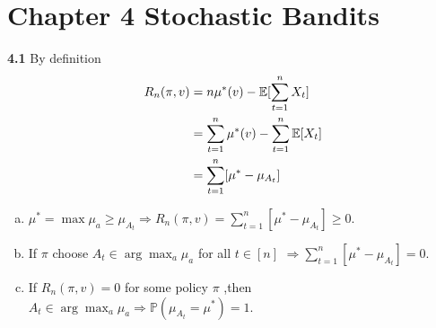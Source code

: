 \chapter*{Chapter 4 Stochastic Bandits}
\label{sec:second}

\noindent\textbf{4.1}
By definition
\begin{align}
R_n(\pi,v) &=n\mu^*(v)-\mathbb{E}[\sum^n_{t=1}X_t]\notag\\
&=\sum^n_{t=1}\mu^*(v)-\sum^n_{t=1}\mathbb{E}[X_t]\notag\\
&=\sum^n_{t=1}[\mu^*-\mu_{A_t}]\notag
\end{align}
\begin{enumerate}[(a)]
    \item $\mu^*=\max\mu_a\ge\mu_{A_t} \Rightarrow R_n(\pi,v)=\sum^n_{t=1}[\mu^*-\mu_{A_t}]\ge0$.

    \item If $\pi$ choose $A_t \in \arg\max_a\mu_a$ for all $t\in[n]$ $\Rightarrow \sum^n_{t=1}[\mu^*-\mu_{A_t}]=0$.

\item If $R_n(\pi,v)=0$ for some policy $\pi$ ,then $A_t \in \arg\max_a\mu_a \Rightarrow \mathbb{P}(\mu_{A_t}=\mu^*)=1$.
\end{enumerate}